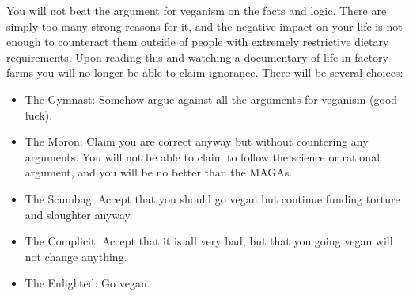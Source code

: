You will not beat the argument for veganism on the facts and logic. There are simply too many strong reasons for it, and the negative impact on your life is not enough to counteract them outside of people with extremely restrictive dietary requirements. Upon reading this and watching a documentary of life in factory farms you will no longer be able to claim ignorance. There will be several choices:

\begin{itemize}
	\item The Gymnast: Somehow argue against all the arguments for veganism (good luck).
	\item The Moron: Claim you are correct anyway but without countering any arguments. You will not be able to claim to follow the science or rational argument, and you will be no better than the MAGAs.
	\item The Scumbag: Accept that you should go vegan but continue funding torture and slaughter anyway.
	\item The Complicit: Accept that it is all very bad, but that you going vegan will not change anything.
	\item The Enlighted: Go vegan.
\end{itemize}